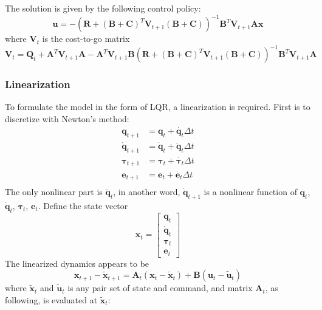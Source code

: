 The solution is given by the following control policy:
\begin{equation}
	\bm{u} = -(\bm{R}+(\bm{B+C})^T\bm{V}_{t+1}(\bm{B+C}) )^{-1} \bm{B}^T\bm{V}_{t+1}\bm{Ax}
\end{equation}
where $\bm{V}_t$ is the cost-to-go matrix 
\begin{equation}
	\bm{V}_t = \bm{Q}_t + \bm{A}^T\bm{V}_{t+1}\bm{A} - \bm{A}^T\bm{V}_{t+1}\bm{B}(\bm{R} + (\bm{B+C})^T\bm{V}_{t+1}(\bm{B+C}))^{-1}\bm{B}^T\bm{V}_{t+1}\bm{A}
\end{equation}

\subsubsection{Linearization}
To formulate the model in the form of LQR, a linearization is required. First is to discretize with Newton's method:
\begin{equation}
	\begin{split}
	\bm{q}_{t+1} &= \bm{q}_{t} + \dot{\bm{q}_{t}} \Delta t \\
	\dot{\bm{q}}_{t+1} &= \dot{\bm{q}}_{t} + \ddot{\bm{q}}_{t} \Delta t \\
	\bm{\tau}_{t+1} &= \bm{\tau}_{t} + \dot{\bm{\tau}_{t}} \Delta t \\
	\bm{e}_{t+1} &= \bm{e}_{t} + \dot{\bm{e}_{t}} \Delta t \\
	\end{split}
\end{equation}
The only nonlinear part is $\ddot{\bm{q}}_t$, in another word, $\dot{\bm{q}}_{t+1}$ is a nonlinear function of $\bm{q}_t$, $\dot{\bm{q}}_t$, ${\bm{\tau}}_t$, ${\bm{e}}_t$. Define the state vector 
\begin{equation}
	\bm{x}_t=\left[ \begin{matrix}\bm{q}_t \\ \dot{\bm{q}}_t \\ \bm{\tau}_t \\ \bm{e}_t \end{matrix} \right]
\end{equation}
The linearized dynamics appears to be
\begin{equation}
	\bm{x}_{t+1} - \tilde{\bm{x}}_{t+1} = \bm{A}_t (\bm{x}_t - \tilde{\bm{x}}_{t}) + \bm{B}(\bm{u}_t - \tilde{\bm{u}}_t)
\end{equation}
where $\tilde{\bm{x}}_t$ and $\tilde{\bm{u}}_t$ is any pair set of state and command, and matrix $\bm{A}_t$, as following, is evaluated at $\tilde{\bm{x}}_t$:
